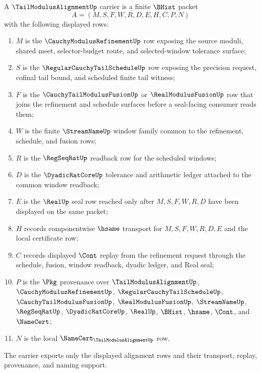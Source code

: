 \begin{definition}
\label{def:tail-modulus-alignment-carrier}
A $\TailModulusAlignmentUp$ carrier is a finite $\BHist$ packet
$$
A=(M,S,F,W,R,D,E,H,C,P,N)
$$
with the following displayed rows:
\begin{enumerate}
\item $M$ is the $\CauchyModulusRefinementUp$ row exposing the source moduli, shared meet, selector-budget route, and selected-window tolerance surface;
\item $S$ is the $\RegularCauchyTailScheduleUp$ row exposing the precision request, cofinal tail bound, and scheduled finite tail witness;
\item $F$ is the $\CauchyTailModulusFusionUp$ or $\RealModulusFusionUp$ row that joins the refinement and schedule surfaces before a seal-facing consumer reads them;
\item $W$ is the finite $\StreamNameUp$ window family common to the refinement, schedule, and fusion rows;
\item $R$ is the $\RegSeqRatUp$ readback row for the scheduled windows;
\item $D$ is the $\DyadicRatCoreUp$ tolerance and arithmetic ledger attached to the common window readback;
\item $E$ is the $\RealUp$ seal row reached only after $M,S,F,W,R,D$ have been displayed on the same packet;
\item $H$ records componentwise $\hsame$ transport for $M,S,F,W,R,D,E$ and the local certificate row;
\item $C$ records displayed $\Cont$ replay from the refinement request through the schedule, fusion, window readback, dyadic ledger, and Real seal;
\item $P$ is the $\Pkg$ provenance over $\TailModulusAlignmentUp$, $\CauchyModulusRefinementUp$, $\RegularCauchyTailScheduleUp$, $\CauchyTailModulusFusionUp$, $\RealModulusFusionUp$, $\StreamNameUp$, $\RegSeqRatUp$, $\DyadicRatCoreUp$, $\RealUp$, $\BHist$, $\hsame$, $\Cont$, and $\NameCert$;
\item $N$ is the local $\NameCert_{\TailModulusAlignmentUp}$ row.
\end{enumerate}
The carrier exports only the displayed alignment rows and their transport, replay, provenance, and naming support.
\end{definition}

